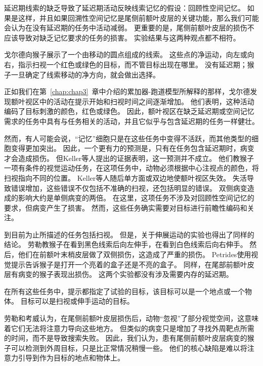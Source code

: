 延迟期线索的缺乏导致了延迟期活动反映线索记忆的假设：回顾性空间记忆。
如果是这样，并且如果回溯性空间记忆是尾侧前额叶皮层的关键功能，那么我们可能会认为在没有延迟期的任务中活动减弱。
更重要的是，尾侧前额叶皮层的损伤不应该导致对缺乏记忆要求的任务的损害。
实验结果与这两种观点都不相符。


戈尔德\cite{gold2007neural}向猴子展示了一个由移动的圆点组成的线索。
这些点的净运动，向左或向右，指示扫视一个红色或绿色的目标，而不管目标出现在哪里。
没有延迟期；猴子一旦确定了线索移动的净方向，就会做出选择。


正如我们在第~\ref{chap:chap3}~章中介绍的累加器-跑道模型所解释的那样，戈尔德发现额叶视区中的活动在提示开始和扫视时间之间逐渐增加。
他们表明，这种活动编码了目标刺激的颜色，红色或绿色。
因此，额叶视区在缺乏延迟期或空间记忆需求的任务中具有与任务相关的活动，并且它似乎与包含延迟期的任务一样健壮。


然而，有人可能会说，“记忆”细胞只是在这些任务中变得不活跃，而其他类型的细胞变得更加突出。
因此，一个更有力的预测是，只有在任务包含延迟期时，病变才会造成损伤。
但Keller等人\cite{keller2008effect}提出的证据表明，这一预测并不成立。
他们教猴子一项有条件的视觉运动任务，在这项任务中，动物必须根据中心注视点的颜色，将扫视指向不同的位置。
Keller等人随后单方面或双边地使额叶视区失效。
失活导致错误增加，这些错误不仅包括不准确的扫视，还包括明显的错误。
双侧病变造成的影响大约是单侧病变的两倍。
在这里，这项任务不涉及对回顾性空间记忆的要求，但病变产生了损害。
然而，这些任务确实需要对目标进行前瞻性编码和关注。


到目前为止所描述的任务包括扫视。
但是，关于伸展运动的实验也得出了同样的结论。
劳勒\cite{lawler1987role}教猴子在看到黑色线索后向左伸手，在看到白色线索后向右伸手。
然后，他们在前额叶末梢皮层做了双侧损伤，这造成了严重的损伤。
Petrides\cite{petrides1985deficits}使用视觉提示告诉猴子是打开一个亮着的盒子还是不亮的盒子。
同样，在尾部前额叶皮层有病变的猴子表现出损伤。
这两个实验都没有涉及需要内存的延迟期。


在所有这些任务中，提示都指定了试验的目标，该目标可以是一个地点\cite{keller2008effect}或一个物体\cite{petrides1985deficits}。
目标可以是扫视\cite{keller2008effect}或伸手运动\cite{lawler1987role}的目标。


劳勒和考威\cite{lawler1987role}认为，在尾侧前额叶皮层损伤后，动物“忽视”了部分视觉空间，这意味着它们无法将注意力导向这些地方。
但类似的病变只是增加了寻找外周靶点所需的时间，而不是导致搜索失败\cite{wardak2004deficit}。
因此，我们认为，患有尾侧前额叶皮层病变的猴子可以检测到外周目标，只是比正常情况稍慢一些。
他们的核心缺陷是难以将注意力引导到作为目标的地点和物体上。



